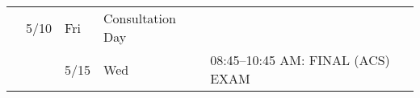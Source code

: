 \begin{longtable}[]{@{}llllll@{}}
\begin{minipage}[t]{0.03\columnwidth}
\strut
\end{minipage} & \begin{minipage}[t]{0.06\columnwidth}\raggedright
5/10\strut
\end{minipage} & \begin{minipage}[t]{0.04\columnwidth}\raggedright
Fri\strut
\end{minipage} & \begin{minipage}[t]{0.49\columnwidth}\raggedright
Consultation Day\strut
\end{minipage} & \begin{minipage}[t]{0.17\columnwidth}\raggedright
\strut
\end{minipage}\tabularnewline
\begin{minipage}[t]{0.03\columnwidth}\raggedright
\strut
\end{minipage} & \begin{minipage}[t]{0.03\columnwidth}\raggedright
\strut
\end{minipage} & \begin{minipage}[t]{0.06\columnwidth}\raggedright
5/15\strut
\end{minipage} & \begin{minipage}[t]{0.04\columnwidth}\raggedright
Wed\strut
\end{minipage} & \begin{minipage}[t]{0.49\columnwidth}\raggedright
08:45--10:45 AM: FINAL (ACS) EXAM\strut
\end{minipage} & \begin{minipage}[t]{0.17\columnwidth}\raggedright
\strut
\end{minipage}\tabularnewline
\bottomrule
\end{longtable}
